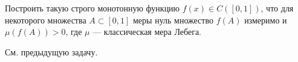 \begin{task}{9}
Построить такую строго монотонную функцию $f(x) \in C([0, 1])$, что для некоторого множества $A \subset [0, 1]$ меры нуль множество $f(A)$ измеримо и $\mu(f(A)) > 0$, где $\mu$ --- классическая мера Лебега.
\end{task}

\begin{solution}
См. предыдущую задачу.
\end{solution}